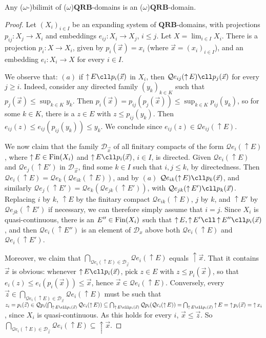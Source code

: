 \documentclass{LMCS}
\newcommand\Smyth{\mathcal Q}
\newcommand\upc{\mathop{\uparrow}\nolimits}
\newcommand\QRB{\mathbf{QRB}}
\begin{document}
\begin{thm}
  \label{thm:qrb:bilimit}
  Any ($\omega$-)bilimit of ($\omega$)$\QRB$-domains is an
  ($\omega$)$\QRB$-domain.
\end{thm}
\begin{proof}
  Let ${(X_i)}_{i \in I}$ be an expanding system of $\QRB$-domains,
  with projections $p_{ij} : X_j \to X_i$ and embeddings $e_{ij} : X_i
  \to X_j$, $i\leq j$.  Let $X = \lim_{i \in I} X_i$.  There is a
  projection $p_i : X \to X_i$, given by $p_i (\vec x) = x_i$ (where
  $\vec x = {(x_i)}_{i \in I}$), and an embedding $e_i : X_i \to X$
  for every $i \in I$.

  We observe that: $(a)$ if $\upc E \cll p_i (\vec x)$ in $X_i$, then
  $\Smyth e_{ij} (\upc E) \cll p_j (\vec x)$ for every $j \geq i$.
  Indeed, consider any directed family ${(y_k)}_{k \in K}$ such that
  $p_j (\vec x) \leq \sup_{k \in K} y_k$.  Then $p_i (\vec x) = p_{ij}
  (p_j (\vec x)) \leq \sup_{k \in K} p_{ij} (y_k)$, so for some $k \in
  K$, there is a $z \in E$ with $z \leq p_{ij} (y_k)$.  Then $e_{ij}
  (z) \leq e_{ij} (p_{ij} (y_k)) \leq y_k$.  We conclude since $e_{ij}
  (z) \in \Smyth e_{ij} (\upc E)$.

  We now claim that the family $\mathcal D_{\vec x}$ of all finitary
  compacts of the form $\Smyth e_i (\upc E)$, where $\upc E \in \Fin
  (X_i)$ and $\upc E \cll p_i (\vec x)$, $i \in I$, is directed.
  Given $\Smyth e_i (\upc E)$ and $\Smyth e_j (\upc E')$ in $\mathcal
  D_{\vec x}$, find some $k \in I$ such that $i, j \leq k$, by
  directedness.  Then $\Smyth e_i (\upc E) = \Smyth e_k (\Smyth e_{ik}
  (\upc E))$, and by $(a)$ $\Smyth e_{ik} (\upc E) \cll p_k (\vec x)$,
  and similarly $\Smyth e_j (\upc E') = \Smyth e_k (\Smyth e_{jk}
  (\upc E'))$, with $\Smyth e_{jk} (\upc E') \cll p_k (\vec x)$.
  Replacing $i$ by $k$, $\upc E$ by the finitary compact $\Smyth
  e_{ik} (\upc E)$, $j$ by $k$, and $\upc E'$ by $\Smyth e_{jk} (\upc
  E')$ if necessary, we can therefore simply assume that $i=j$.  Since
  $X_i$ is quasi-continuous, there is an $E'' \in \mathop{\text{Fin}} (X_i)$ such
  that $\upc E, \upc E' \cll \upc E'' \cll p_i (\vec x)$, and then
  $\Smyth e_i (\upc E'')$ is an element of $\mathcal D_x$ above both
  $\Smyth e_i (\upc E)$ and $\Smyth e_i (\upc E')$.

  Moreover, we claim that $\bigcap_{\Smyth e_i (\upc E) \in \mathcal
    D_{\vec x}} \Smyth e_i (\upc E)$ equals $\upc \vec x$.  That it
  contains $\vec x$ is obvious: whenever $\upc E \cll p_i (\vec x)$,
  pick $z \in E$ with $z \leq p_i (\vec x)$, so that $e_i (z) \leq e_i
  (p_i (\vec x)) \leq \vec x$, hence $\vec x \in \Smyth e_i (\upc E)$.
  Conversely, every $\vec z \in \bigcap_{\Smyth e_i (\upc E) \in
    \mathcal D_{\vec x}} \Smyth e_i (\upc E)$ must be such that $z_i =
  p_i (\vec z) \in \Smyth p_i (\bigcap_{\upc E \cll p_i (\vec x)}
  \Smyth e_i (\upc E)) \subseteq \bigcap_{\upc E \cll p_i (\vec x)}
  \Smyth p_i (\Smyth e_i (\upc E)) = \bigcap_{\upc E \cll p_i (\vec
    x)} \upc E = \upc p_i (\vec x) = \upc x_i$, since $X_i$ is
  quasi-continuous.  As this holds for every $i$, $\vec x \leq \vec
  z$.  So $\bigcap_{\Smyth e_i (\upc E) \in \mathcal D_{\vec x}}
  \Smyth e_i (\upc E) \subseteq \upc \vec x$.


\end{proof}
\end{document}
